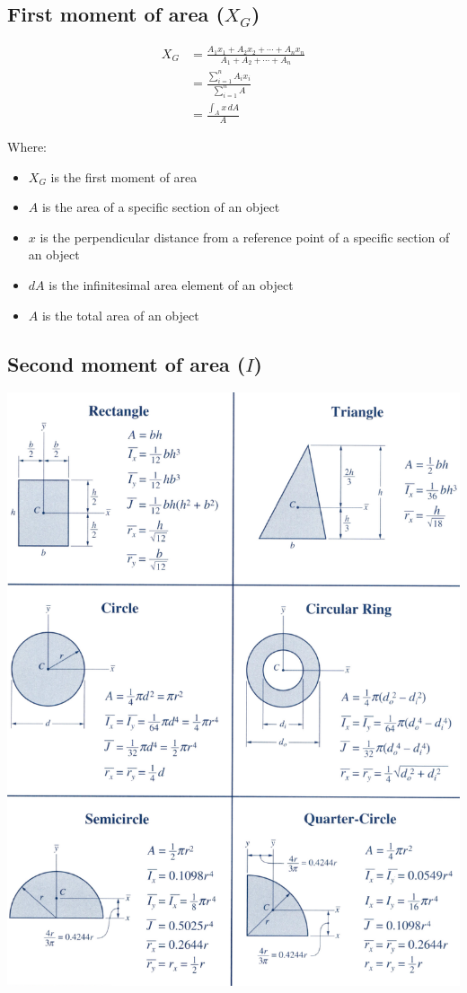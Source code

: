 \documentclass[11pt]{article}
\begin{document}
\newpage

\subsection{First moment of area (\(X_G\))}
\label{sec:org8969a9c}
\begin{align*}
X_G &= \frac{A_1 x_1 + A_2 x_2 + \cdots + A_n x_n}{A_1 + A_2 + \cdots + A_n} \\
&= \frac{\sum_{i = 1}^n A_i x_i}{\sum_{i = 1}^n A} \\
&= \frac{\int_A x \, dA}{A}
\end{align*}

Where:
\begin{itemize}
\item \(X_G\) is the first moment of area
\item \(A\) is the area of a specific section of an object
\item \(x\) is the perpendicular distance from a reference point of a specific section of an object
\item \(dA\) is the infinitesimal area element of an object
\item \(A\) is the total area of an object
\end{itemize}

\subsection{Second moment of area (\(I\))}
\label{sec:org97dfe14}
\begin{center}
\includegraphics[width=.9\linewidth]{./images/second-moment-of-area.png}
\end{center}
\end{document}
